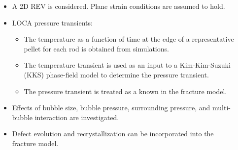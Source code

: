 \begin{frame}
\begin{columns}[T]
\begin{column}{0.4\textwidth}
    \end{column}
    \begin{column}{0.4\textwidth}
      \begin{itemize}
        \item A 2D REV is considered. Plane strain conditions are assumed to hold.
        \item LOCA pressure transients:
              \begin{itemize}
                \item The temperature as a function of time at the edge of a representative pellet for each rod is obtained from simulations.
                \item The temperature transient is used as an input to a Kim-Kim-Suzuki (KKS) phase-field model \cite{Aagesen2020} to determine the pressure transient.
                \item The pressure transient is treated as a known in the fracture model.
              \end{itemize}
        \item Effects of bubble size, bubble pressure, surrounding pressure, and multi-bubble interaction are investigated.
        \item Defect evolution and recrystallization can be incorporated into the fracture model.
      \end{itemize}
    \end{column}
  \end{columns}
\end{frame}
